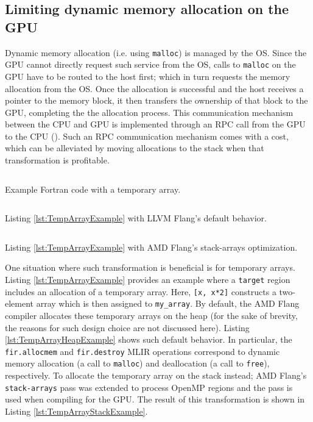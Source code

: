 \documentclass[acmtog,natbib=false]{acmart}
\newcommand{\code}[1]{\texttt{#1}\xspace}
\begin{document}
\subsection{Limiting dynamic memory allocation on the GPU}
Dynamic memory allocation (i.e. using \code{malloc}) is managed by the \ac{OS}.
Since the GPU cannot directly request such service from the \ac{OS}, calls to \code{malloc} on the GPU have to be routed to the host first; which in turn requests the memory allocation from the \ac{OS}.
Once the allocation is successful and the host receives a pointer to the memory block, it then transfers the ownership of that block to the GPU, completing the the allocation process.
This communication mechanism between the CPU and GPU is implemented through an \ac{RPC} call from the GPU to the CPU (\cite{gpulibc}).
Such an \ac{RPC} communication mechanism comes with a cost, which can be alleviated by moving allocations to the stack when that transformation is profitable.

\begin{listing}[t]
\inputminted{Fortran}{code/temp_array.f90}
\caption{Example Fortran code with a temporary array.}
\label{lst:TempArrayExample}
\end{listing}

\begin{listing}[t]
\inputminted{MLIR-lexer.py:MlirLexer -x}{code/temp_array_heap.mlir}
\caption{Listing \ref{lst:TempArrayExample} with LLVM Flang's default behavior.}
\label{lst:TempArrayHeapExample}
\end{listing}

\begin{listing}[t]
\inputminted{MLIR-lexer.py:MlirLexer -x}{code/temp_array_stack.mlir}
\caption{Listing \ref{lst:TempArrayExample} with AMD Flang's stack-arrays optimization.}
\label{lst:TempArrayStackExample}
\end{listing}

One situation where such transformation is beneficial is for temporary arrays.
Listing \ref{lst:TempArrayExample} provides an example where a \code{target} region includes an allocation of a temporary array.
Here, \code{[x, x*2]} constructs a two-element array which is then assigned to \code{my\_array}.
By default, the AMD Flang compiler allocates these temporary arrays on the heap (for the sake of brevity, the reasons for such design choice are not discussed here).
Listing \ref{lst:TempArrayHeapExample} shows such default behavior.
In particular, the \code{fir.allocmem} and \code{fir.destroy} \ac{MLIR} operations correspond to dynamic memory allocation (a call to \code{malloc}) and deallocation (a call to \code{free}), respectively.
To allocate the temporary array on the stack instead; AMD Flang's \code{stack-arrays} pass was extended to process OpenMP regions and the pass is used when compiling for the GPU.
The result of this transformation is shown in Listing \ref{lst:TempArrayStackExample}.
\end{document}
